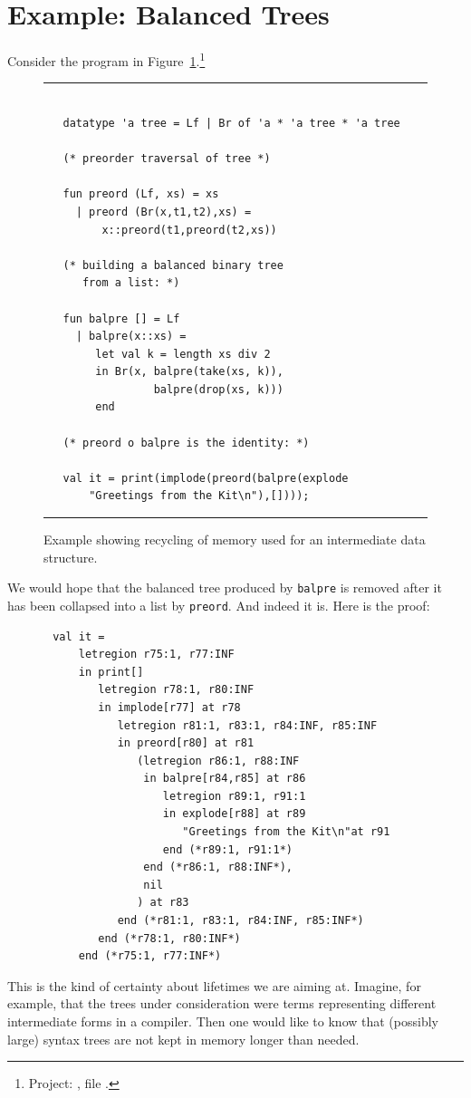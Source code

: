 \documentclass[12pt]{book}
\begin{document}
\section{Example: Balanced Trees}
Consider the program in
Figure~\ref{balpre.fig}.\footnote{Project: , file
  .}\begin{figure} \hrule
\begin{verbatim}

   datatype 'a tree = Lf | Br of 'a * 'a tree * 'a tree

   (* preorder traversal of tree *)

   fun preord (Lf, xs) = xs
     | preord (Br(x,t1,t2),xs) = 
         x::preord(t1,preord(t2,xs))

   (* building a balanced binary tree
      from a list: *)

   fun balpre [] = Lf
     | balpre(x::xs) = 
        let val k = length xs div 2
        in Br(x, balpre(take(xs, k)),
                 balpre(drop(xs, k)))
        end

   (* preord o balpre is the identity: *)

   val it = print(implode(preord(balpre(explode 
       "Greetings from the Kit\n"),[])));
\end{verbatim}
\caption{Example showing recycling of memory used for an intermediate 
data structure.}
\medskip

\hrule
\label{balpre.fig}
\end{figure}
We would hope that the balanced tree
produced by {\tt balpre} is removed after it
has been collapsed into a list by {\tt preord}.
And indeed it is. Here is the proof:
\begin{verbatim}
       val it = 
           letregion r75:1, r77:INF 
           in print[] 
              letregion r78:1, r80:INF 
              in implode[r77] at r78 
                 letregion r81:1, r83:1, r84:INF, r85:INF 
                 in preord[r80] at r81 
                    (letregion r86:1, r88:INF 
                     in balpre[r84,r85] at r86 
                        letregion r89:1, r91:1 
                        in explode[r88] at r89 
                           "Greetings from the Kit\n"at r91 
                        end (*r89:1, r91:1*) 
                     end (*r86:1, r88:INF*), 
                     nil
                    ) at r83 
                 end (*r81:1, r83:1, r84:INF, r85:INF*) 
              end (*r78:1, r80:INF*) 
           end (*r75:1, r77:INF*)
\end{verbatim}
This is the kind of certainty about lifetimes we are aiming at.
Imagine, for example, that the trees under consideration 
were terms representing
different intermediate forms in a compiler. Then one would
like to know that (possibly large) syntax trees are not
kept in memory longer than needed.
\end{document}
